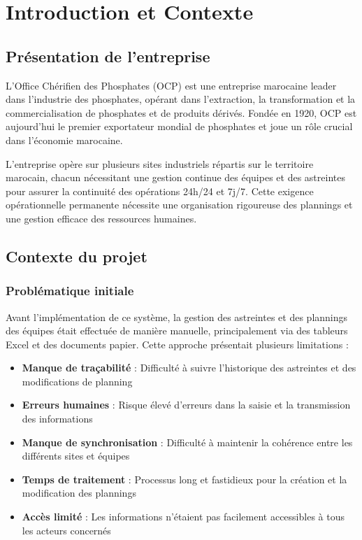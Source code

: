 \chapter{Introduction et Contexte}

\section{Présentation de l'entreprise}
L'Office Chérifien des Phosphates (OCP) est une entreprise marocaine leader dans l'industrie des phosphates, opérant dans l'extraction, la transformation et la commercialisation de phosphates et de produits dérivés. Fondée en 1920, OCP est aujourd'hui le premier exportateur mondial de phosphates et joue un rôle crucial dans l'économie marocaine.

L'entreprise opère sur plusieurs sites industriels répartis sur le territoire marocain, chacun nécessitant une gestion continue des équipes et des astreintes pour assurer la continuité des opérations 24h/24 et 7j/7. Cette exigence opérationnelle permanente nécessite une organisation rigoureuse des plannings et une gestion efficace des ressources humaines.

\section{Contexte du projet}
\subsection{Problématique initiale}
Avant l'implémentation de ce système, la gestion des astreintes et des plannings des équipes était effectuée de manière manuelle, principalement via des tableurs Excel et des documents papier. Cette approche présentait plusieurs limitations :

\begin{itemize}
    \item \textbf{Manque de traçabilité} : Difficulté à suivre l'historique des astreintes et des modifications de planning
    \item \textbf{Erreurs humaines} : Risque élevé d'erreurs dans la saisie et la transmission des informations
    \item \textbf{Manque de synchronisation} : Difficulté à maintenir la cohérence entre les différents sites et équipes
    \item \textbf{Temps de traitement} : Processus long et fastidieux pour la création et la modification des plannings
    \item \textbf{Accès limité} : Les informations n'étaient pas facilement accessibles à tous les acteurs concernés
\end{itemize}


